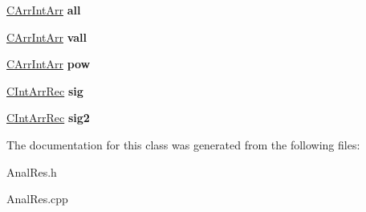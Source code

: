 \begin{DoxyCompactItemize}
\item 
\hypertarget{class_c_anal_res_a0df5f1a920daa06c8b6bb467e2df58ae}{\hyperlink{class_c_arr_int_arr}{C\-Arr\-Int\-Arr} {\bfseries all}}\label{class_c_anal_res_a0df5f1a920daa06c8b6bb467e2df58ae}

\item 
\hypertarget{class_c_anal_res_aea0a3ecd3d283aa3e798601202adb9ac}{\hyperlink{class_c_arr_int_arr}{C\-Arr\-Int\-Arr} {\bfseries vall}}\label{class_c_anal_res_aea0a3ecd3d283aa3e798601202adb9ac}

\item 
\hypertarget{class_c_anal_res_a4771d8daa504be3ecf978e72af60c31c}{\hyperlink{class_c_arr_int_arr}{C\-Arr\-Int\-Arr} {\bfseries pow}}\label{class_c_anal_res_a4771d8daa504be3ecf978e72af60c31c}

\item 
\hypertarget{class_c_anal_res_abc4d366baf560c76cc90cc468d47ac2b}{\hyperlink{class_c_int_arr_rec}{C\-Int\-Arr\-Rec} {\bfseries sig}}\label{class_c_anal_res_abc4d366baf560c76cc90cc468d47ac2b}

\item 
\hypertarget{class_c_anal_res_af769ec794c458188f1d6b787942ad1b2}{\hyperlink{class_c_int_arr_rec}{C\-Int\-Arr\-Rec} {\bfseries sig2}}\label{class_c_anal_res_af769ec794c458188f1d6b787942ad1b2}

\end{DoxyCompactItemize}


The documentation for this class was generated from the following files\-:\begin{DoxyCompactItemize}
\item 
Anal\-Res.\-h\item 
Anal\-Res.\-cpp\end{DoxyCompactItemize}
